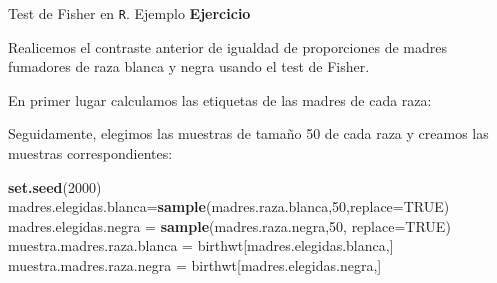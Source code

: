 \documentclass[
  ignorenonframetext,
]{beamer}
\newenvironment{Shaded}{\begin{snugshade}}{\end{snugshade}}
\newcommand{\DataTypeTok}[1]{\textcolor[rgb]{0.13,0.29,0.53}{#1}}
\newcommand{\DecValTok}[1]{\textcolor[rgb]{0.00,0.00,0.81}{#1}}
\newcommand{\KeywordTok}[1]{\textcolor[rgb]{0.13,0.29,0.53}{\textbf{#1}}}
\newcommand{\NormalTok}[1]{#1}
\newcommand{\OperatorTok}[1]{\textcolor[rgb]{0.81,0.36,0.00}{\textbf{#1}}}
\newcommand{\OtherTok}[1]{\textcolor[rgb]{0.56,0.35,0.01}{#1}}
\newcommand{\StringTok}[1]{\textcolor[rgb]{0.31,0.60,0.02}{#1}}
\begin{document}
\begin{frame}[fragile]{Test de Fisher en \texttt{R}. Ejemplo}
\protect\hypertarget{test-de-fisher-en-r.-ejemplo}{}
\textbf{Ejercicio}

Realicemos el contraste anterior de igualdad de proporciones de madres
fumadores de raza blanca y negra usando el test de Fisher.

En primer lugar calculamos las etiquetas de las madres de cada raza:

\begin{Shaded}
\end{Shaded}

Seguidamente, elegimos las muestras de tamaño 50 de cada raza y creamos
las muestras correspondientes:

\begin{Shaded}
\begin{Highlighting}[]
\KeywordTok{set.seed}\NormalTok{(}\DecValTok{2000}\NormalTok{)}
\NormalTok{madres.elegidas.blanca=}\KeywordTok{sample}\NormalTok{(madres.raza.blanca,}\DecValTok{50}\NormalTok{,}\DataTypeTok{replace=}\OtherTok{TRUE}\NormalTok{)}
\NormalTok{madres.elegidas.negra =}\StringTok{ }\KeywordTok{sample}\NormalTok{(madres.raza.negra,}\DecValTok{50}\NormalTok{, }\DataTypeTok{replace=}\OtherTok{TRUE}\NormalTok{)}
\NormalTok{muestra.madres.raza.blanca =}\StringTok{ }\NormalTok{birthwt[madres.elegidas.blanca,]}
\NormalTok{muestra.madres.raza.negra =}\StringTok{ }\NormalTok{birthwt[madres.elegidas.negra,]}
\end{Highlighting}
\end{Shaded}
\end{frame}
\end{document}
